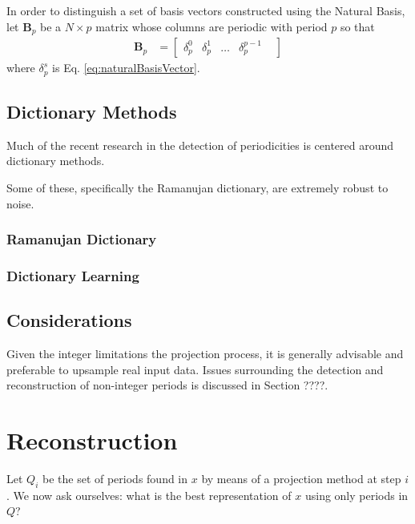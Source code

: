     In order to distinguish a set of basis vectors constructed using the Natural Basis, let $\bm{B}_p$ be a $N \times p$ matrix whose columns are periodic with period $p$ so that
    \begin{align}
        \bm{B}_p &= \begin{bmatrix}
                \delta^0_p &
                \delta^1_p &
                \hdots &
                \delta^{p-1}_p &
            \end{bmatrix}
    \end{align}
    where $\delta^s_p$ is Eq. \ref{eq:naturalBasisVector}.


    \subsection{Dictionary Methods}
    Much of the recent research in the detection of periodicities is centered around dictionary methods.

    Some of these, specifically the Ramanujan dictionary, are extremely robust to noise.

        \subsubsection{Ramanujan Dictionary}

        \subsubsection{Dictionary Learning}

    \subsection{Considerations}
    Given the integer limitations the projection process, it is generally advisable and preferable to upsample real input data. Issues surrounding the detection and reconstruction of non-integer periods is discussed in Section ????.

\section{Reconstruction}
Let $Q_i$ be the set of periods found in $x$ by means of a projection method at step $i$. We now ask ourselves: what is the best representation of $x$ using only periods in $Q$?

